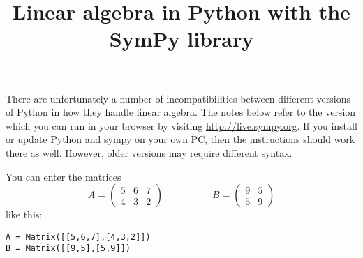 \documentclass{amsart}
\title{Linear algebra in Python with the SymPy library}
\begin{document}
\maketitle

There are unfortunately a number of incompatibilities between
different versions of Python  in how they handle linear algebra.  The
notes below refer to the version which you can run in your browser by
visiting \url{http://live.sympy.org}.  If you install or update Python
and sympy on your own PC, then the instructions should work there
as well.  However, older versions may require different syntax.

You can enter the matrices 
\[ A = 
   \begin{pmatrix}
    5 & 6 & 7 \\
    4 & 3 & 2 
   \end{pmatrix}
   \hspace{5em}
   B = 
    \begin{pmatrix}
     9 & 5 \\ 5 & 9
    \end{pmatrix}
\]
like this:
\begin{verbatim}
A = Matrix([[5,6,7],[4,3,2]])
B = Matrix([[9,5],[5,9]])
\end{verbatim}
\end{document}
